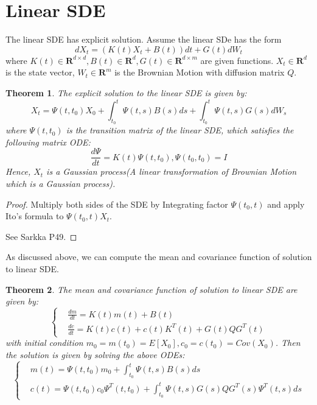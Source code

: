 \documentclass{article}
\newtheorem{theorem}{Theorem}
\begin{document}
\section{Linear SDE}
The linear SDE has explicit solution. Assume the linear SDe has the form 
\begin{equation}
    dX_t =\left(K(t)X_t + B(t)\right)dt + G(t)dW_t
\end{equation}
where $K(t)\in \mathbf{R}^{d\times d}, B(t)\in \mathbf{R}^{d}, G(t)\in \mathbf{R}^{d\times m}$ are given functions. 
$X_t \in \mathbf{R}^d$ is the state vector, $W_t \in \mathbf{R}^m$ is the Brownian Motion with diffusion matrix $Q$.

\begin{theorem}
    The explicit solution to the linear SDE is given by:
    \begin{equation}\label{explicitsolLSDE}
        X_t = \Psi(t, t_0)X_0 + \int_{t_0}^t \Psi(t, s)B(s)ds + \int_{t_0}^t \Psi(t, s)G(s)dW_s
    \end{equation}
    where $\Psi(t, t_0)$ is the transition matrix of the linear SDE, which satisfies the following matrix ODE:
    \begin{equation}
        \frac{d\Psi}{dt} = K(t)\Psi(t, t_0), \Psi(t_0, t_0) = I
    \end{equation}
    Hence, $X_t$ is a Gaussian process(A linear transformation of Brownian Motion which is a Gaussian process).
\end{theorem}
\begin{proof}
    Multiply both sides of the SDE by Integrating factor $\Psi(t_0, t)$ and apply Ito's formula to $\Psi(t_0, t)X_t$.

    See Sarkka P49.
\end{proof}
As discussed above, we can compute the mean and covariance function of solution to linear SDE. 
\begin{theorem}
    The mean and covariance function of solution to linear SDE are given by:
    \begin{equation}
        \left\{
            \begin{aligned}
                &\frac{d m}{d t} = K(t)m(t) + B(t)\\
                &\frac{d c}{d t} = K(t)c(t) + c(t)K^T(t)+ G(t)QG^T(t)
            \end{aligned}
        \right.
    \end{equation}
    with initial condition $m_0 =m(t_0)=E[X_0], c_0 =c(t_0)=Cov(X_0)$. Then the solution is given by solving the above ODEs:
    \begin{equation}\label{LSDEMC}
        \left\{
            \begin{aligned}
                &m(t) = \Psi(t, t_0)m_0 + \int_{t_0}^t \Psi(t, s)B(s)ds\\
                &c(t) = \Psi(t, t_0)c_0\Psi^T(t, t_0) + \int_{t_0}^t \Psi(t, s)G(s)QG^T(s)\Psi^T(t, s)ds
            \end{aligned}
        \right.
    \end{equation}

\end{theorem}
\end{document}
